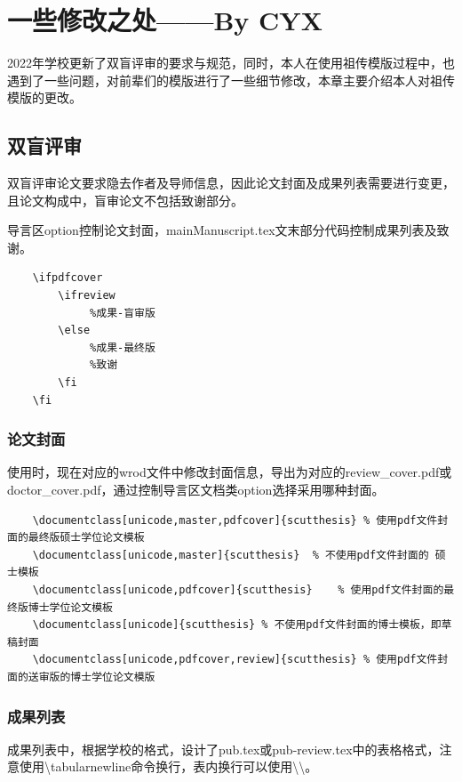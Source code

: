 \chapter{一些修改之处——By CYX}
2022年学校更新了双盲评审的要求与规范，同时，本人在使用祖传模版过程中，也遇到了一些问题，对前辈们的模版进行了一些细节修改，本章主要介绍本人对祖传模版的更改。

\section{双盲评审}
双盲评审论文要求隐去作者及导师信息，因此论文封面及成果列表需要进行变更，且论文构成中，盲审论文不包括致谢部分。

导言区option控制论文封面，mainManuscript.tex文末部分代码控制成果列表及致谢。
\begin{lstlisting}
    \ifpdfcover
        \ifreview
             %成果-盲审版
        \else
             %成果-最终版
             %致谢
        \fi
    \fi
\end{lstlisting}
\subsection{论文封面}
使用时，现在对应的wrod文件中修改封面信息，导出为对应的review\_cover.pdf或doctor\_cover.pdf，通过控制导言区文档类option选择采用哪种封面。
\begin{lstlisting}
    \documentclass[unicode,master,pdfcover]{scutthesis}	% 使用pdf文件封面的最终版硕士学位论文模板
    \documentclass[unicode,master]{scutthesis}	% 不使用pdf文件封面的 硕士模板
    \documentclass[unicode,pdfcover]{scutthesis}	% 使用pdf文件封面的最终版博士学位论文模板
    \documentclass[unicode]{scutthesis}	% 不使用pdf文件封面的博士模板，即草稿封面
    \documentclass[unicode,pdfcover,review]{scutthesis}	% 使用pdf文件封面的送审版的博士学位论文模版
\end{lstlisting}
\subsection{成果列表}
成果列表中，根据学校的格式，设计了pub.tex或pub-review.tex中的表格格式，注意使用\textbackslash{}tabularnewline命令换行，表内换行可以使用\textbackslash{}\textbackslash{}。


